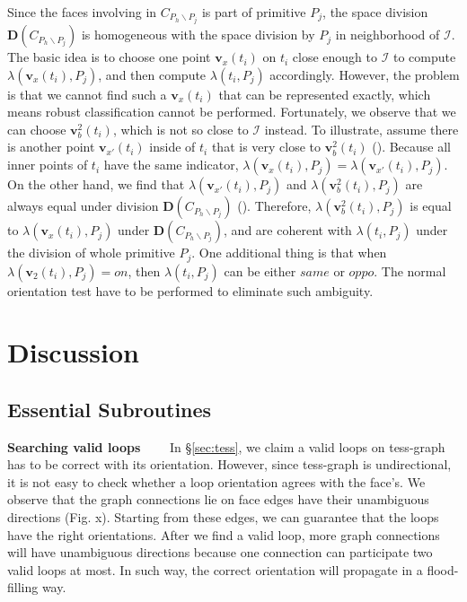 \documentclass[10pt,journal,compsoc]{IEEEtran}
\begin{document}
Since the faces involving in $C_{P_h \backslash P_j}$ is part of primitive $P_j$, the space division $\boldsymbol{D}(C_{P_h \backslash P_j})$ is homogeneous with the space division by $P_j$ in neighborhood of $\bm{\mathcal{I}}$. The basic idea is to choose one point $\bm{v}_x(t_i)$ on $t_i$ close enough to $\bm{\mathcal{I}}$ to compute $\lambda(\bm{v}_x(t_i), P_j)$, and then compute $\lambda(t_i, P_j)$ accordingly. However, the problem is that we cannot find such a $\bm{v}_x(t_i)$ that can be represented exactly, which means robust classification cannot be performed. Fortunately, we observe that we can choose $\bm{v}_b^2(t_i)$, which is not so close to $\bm{\mathcal{I}}$ instead. To illustrate, assume there is another point $\bm{v}_{x'}(t_i)$ inside of $t_i$ that is very close to $\bm{v}_b^2(t_i)$ ({\color{red}{Fig. x}}). Because all inner points of $t_i$ have the same indicator, $\lambda(\bm{v}_x(t_i), P_j) = \lambda(\bm{v}_{x'}(t_i), P_j)$. On the other hand, we find that $\lambda(\bm{v}_{x'}(t_i), P_j)$ and $\lambda(\bm{v}_b^2(t_i), P_j)$ are always equal under division $\boldsymbol{D}(C_{P_h \backslash P_j})$ ({}). Therefore, $\lambda(\bm{v}_b^2(t_i), P_j)$ is equal to $\lambda(\bm{v}_x(t_i), P_j)$ under $\boldsymbol{D}(C_{P_h \backslash P_j})$, and are coherent with $\lambda(t_i, P_j)$ under the division of whole primitive $P_j$. One additional thing is that when $\lambda(\bm{v}_2(t_i), P_j)=on$, then $\lambda(t_i, P_j)$ can be either $same$ or $oppo$. The normal orientation test have to be performed to eliminate such ambiguity.

\fi

\section{Discussion}

\vspace{0.5em}

\subsection{Essential Subroutines}
\label{sec:esubroutine}

\vspace{0.5em}
\noindent\textbf{Searching valid loops}~~~~ In \S\ref{sec:tess}, we claim a valid loops on tess-graph has to be correct with its orientation. However, since tess-graph is undirectional, it is not easy to check whether a loop orientation agrees with the face's. We observe that the graph connections lie on face edges have their unambiguous directions (Fig. x). Starting from these edges, we can guarantee that the loops have the right orientations. After we find a valid loop, more graph connections will have unambiguous directions because one connection can participate two valid loops at most. In such way, the correct orientation will propagate in a flood-filling way.
\end{document}
